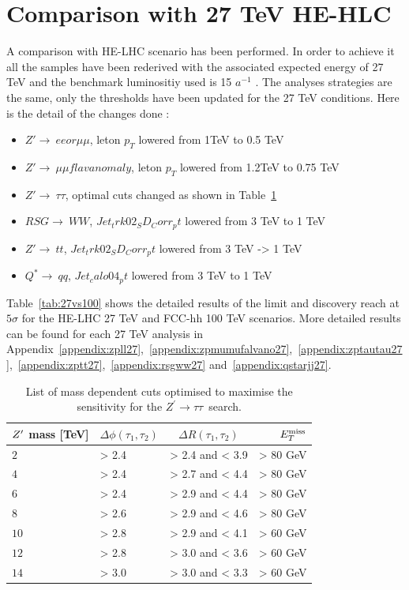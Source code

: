 \documentclass{cernrep}
\newcommand*{\Zptata}{\ensuremath{Z^{\prime}\rightarrow \tau\tau}}
\newcommand*{\met}{\ensuremath{E_{T}^{\rm{miss}}}}
\begin{document}
\section{Comparison with 27 TeV HE-HLC}
\label{sec:ana27tev}
A comparison with HE-LHC scenario has been performed.
In order to achieve it all the samples have been rederived with the associated expected energy of 27 TeV and the benchmark luminositiy used is 15 $a^{-1}$ .
\newline
The analyses strategies are the same, only the thresholds have been updated for the 27 TeV conditions. Here is the detail of the changes done :
\begin{itemize}
\item $Z'\rightarrow~ee or \mu\mu$, leton $p_T$ lowered from 1TeV to 0.5 TeV
\item $Z'\rightarrow~\mu\mu flav anomaly$, leton $p_T$ lowered from  1.2TeV to 0.75 TeV
\item $Z'\rightarrow~\tau\tau$, optimal cuts changed as shown in Table~\ref{tab:leptonicresonances:selectiontautau27}
\item $RSG\rightarrow~WW$, $Jet_trk02_SD_Corr_pt$ lowered from 3 TeV to 1 TeV
\item $Z'\rightarrow~tt$, $Jet_trk02_SD_Corr_pt$ lowered from 3 TeV -> 1 TeV
\item $Q^*\rightarrow~qq$, $Jet_calo04_pt$ lowered from 3 TeV to 1 TeV
\end{itemize}

Table~\ref{tab:27vs100} shows the detailed results of the limit and discovery reach at $5\sigma$ for the HE-LHC 27 TeV and FCC-hh 100 TeV scenarios. More detailed results can be found for each 27 TeV analysis in Appendix~\ref{appendix:zpll27},~\ref{appendix:zpmumufalvano27},~\ref{appendix:zptautau27},~\ref{appendix:zptt27},~\ref{appendix:rsgww27}  and~\ref{appendix:qstarjj27}.

\begin{table}[htbp]
   \centering
\begin{tabular}{|l|l|c|r|}
  \hline
  \hline
   $Z^{\prime}$ mass [TeV] &  $\Delta \phi(\tau_1, \tau_2)$&  $\Delta R(\tau_1, \tau_2)$ & $\met$\\
  \hline
   $2$ & > 2.4 & > 2.4 and < 3.9 & > 80 GeV\\
   $4$ & > 2.4 & > 2.7 and < 4.4 & > 80 GeV\\
   $6$ & > 2.4 & > 2.9 and < 4.4 & > 80 GeV\\
   $8$ & > 2.6 & > 2.9 and < 4.6 & > 80 GeV\\
  $10$ & > 2.8 & > 2.9 and < 4.1 & > 60 GeV\\
  $12$ & > 2.8 & > 3.0 and < 3.6 & > 60 GeV\\
  $14$ & > 3.0 & > 3.0 and < 3.3 & > 60 GeV\\
  \hline
  \hline
  \end{tabular}
  \caption{List of mass dependent cuts optimised to maximise the sensitivity for the \Zptata\ search.}
  \label{tab:leptonicresonances:selectiontautau27}
\end{table}
\end{document}
